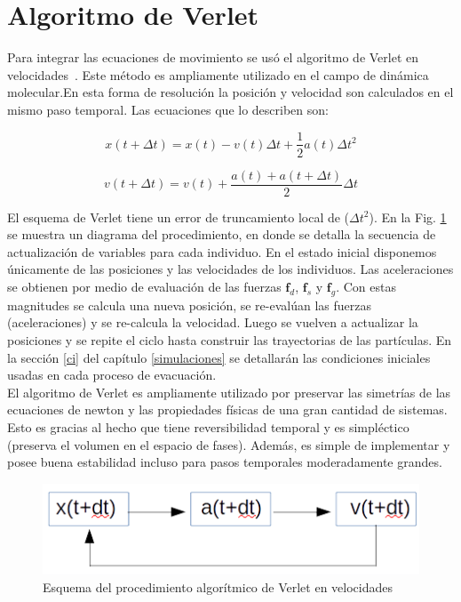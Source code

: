\section{\label{verlet} Algoritmo de Verlet}

Para integrar las ecuaciones de movimiento se usó el algoritmo de Verlet en velocidades~\cite{haile}. Este método es ampliamente utilizado en el campo de dinámica molecular.En esta forma de resolución la posición y velocidad son calculados en el mismo paso temporal. Las ecuaciones que lo describen son:

\begin{equation}
x(t+\Delta t)=x(t)-v(t)\Delta t + \frac{1}{2}a(t)\Delta t^2 
\label{verlet_x}
\end{equation} 

\begin{equation}
v(t+\Delta t)=v(t)+\frac{a(t)+a(t+\Delta t)}{2}\Delta t
\label{verlet_v}
\end{equation}

El esquema de Verlet tiene un error de truncamiento local de ($\Delta t^2$). En la Fig. \ref{esquema_verlet} se muestra un diagrama del procedimiento, en donde se detalla la secuencia de actualización de variables para cada individuo. En el estado inicial disponemos únicamente de las posiciones y las velocidades de los individuos. Las aceleraciones se obtienen por medio de evaluación de las fuerzas $\mathbf{f}_d$, $\mathbf{f}_s$ y $\mathbf{f}_g$. Con estas magnitudes 
se calcula una nueva posición, se re-evalúan las fuerzas (aceleraciones) y se re-calcula la velocidad. Luego se vuelven a actualizar la posiciones y se repite el ciclo hasta construir las trayectorias de las partículas.
En la sección \ref{ci} del capítulo \ref{simulaciones} se detallarán las condiciones iniciales usadas en cada proceso de evacuación.\\

El algoritmo de Verlet es ampliamente utilizado por preservar las simetrías de las ecuaciones de newton y las propiedades físicas de una gran cantidad de sistemas. Esto es gracias al hecho que tiene reversibilidad temporal y es simpléctico (preserva el volumen en el espacio de fases). Además, es simple de implementar y posee buena estabilidad incluso para pasos temporales moderadamente grandes.

\begin{figure}[H]
    \centering
        \includegraphics[scale=0.7]{figuras/esquema_verlet.png}
    \caption[width=5cm]{Esquema del procedimiento algorítmico de Verlet en velocidades}
    \label{esquema_verlet}
\end{figure}
